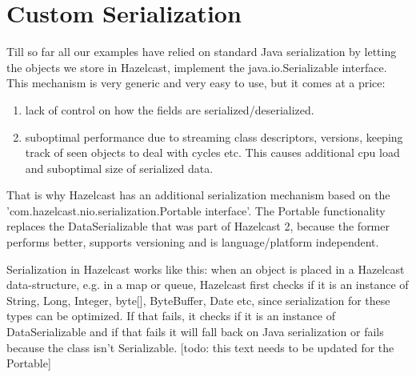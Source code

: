 \chapter{Custom Serialization}
Till so far all our examples have relied on standard Java serialization by letting the objects we store in Hazelcast, implement the java.io.Serializable interface. This mechanism is very generic and very easy to use, but it comes at a price:
\begin{enumerate}
\item lack of control on how the fields are serialized/deserialized.
\item suboptimal performance due to streaming class descriptors, versions, keeping track of seen objects to deal with cycles etc. This causes additional cpu load and suboptimal size of serialized data.
\end{enumerate}
That is why Hazelcast has an additional serialization mechanism based on the 'com.hazelcast.nio.serialization.Portable interface'. The Portable functionality replaces the DataSerializable that was part of Hazelcast 2, because the former performs better, supports versioning and is language/platform independent.

Serialization in Hazelcast works like this: when an object is placed in a Hazelcast data-structure, e.g. in a map or queue, Hazelcast first checks if it is an instance of String, Long, Integer, byte[], ByteBuffer, Date etc, since serialization for these types can be optimized. If that fails, it checks if it is an instance of DataSerializable and if that fails it will fall back on Java serialization or fails because the class isn't Serializable. [todo: this text needs to be updated for the Portable]

